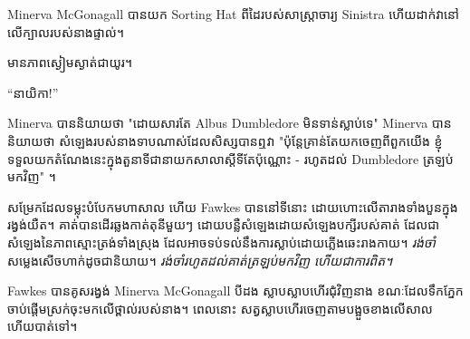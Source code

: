 Minerva McGonagall បានយក Sorting Hat ពីដៃរបស់សាស្រ្តាចារ្យ Sinistra ហើយដាក់វានៅលើក្បាលរបស់នាងផ្ទាល់។

មានភាពស្ងៀមស្ងាត់ជាយូរ។

“នាយិកា!”

Minerva បាននិយាយថា "ដោយសារតែ Albus Dumbledore មិនទាន់ស្លាប់ទេ" Minerva បាននិយាយថា សំឡេងរបស់នាងទាបណាស់ដែលសិស្សបានឮវា "ប៉ុន្តែគ្រាន់តែយកចេញពីពួកយើង ខ្ញុំទទួលយកតំណែងនេះក្នុងតួនាទីជានាយកសាលាស្តីទីតែប៉ុណ្ណោះ - រហូតដល់ Dumbledore ត្រឡប់មកវិញ" ។

សម្រែក​ដែល​ទម្លុះ​បំបែក​មហាសាល ហើយ Fawkes បាន​នៅ​ទី​នោះ ដោយ​ហោះ​លើ​តារាង​ទាំង​បួន​ក្នុង​រង្វង់​យឺត។ គាត់បានដើរឆ្លងកាត់តុនីមួយៗ ដោយបន្លឺសំឡេងដោយសំឡេងបក្សីរបស់គាត់ ដែលជាសំឡេងនៃភាពស្មោះត្រង់ទាំងស្រុង ដែលអាចទប់ទល់នឹងការស្លាប់ដោយភ្លើងឆេះរាងកាយ។ \emph{រង់ចាំ} សម្លេងសើចហាក់ដូចជានិយាយ។ \emph{រង់ចាំរហូតដល់គាត់ត្រឡប់មកវិញ ហើយជាការពិត។}

Fawkes បានគូសរង្វង់ Minerva McGonagall បីដង ស្លាបស្លាបហើរជុំវិញនាង ខណៈដែលទឹកភ្នែកចាប់ផ្តើមស្រក់ចុះមកលើថ្ពាល់របស់នាង។ ពេល​នោះ សត្វ​ស្លាប​ហើរ​ចេញ​តាម​បង្អួច​ខាង​លើ​សាល ហើយ​បាត់​ទៅ។

